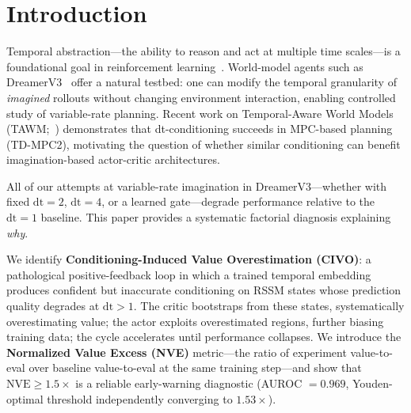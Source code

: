 \documentclass[10pt,letterpaper]{article}
\begin{document}
\section{Introduction}

Temporal abstraction---the ability to reason and act at multiple time scales---is a foundational goal in reinforcement learning~\citep{sutton1999options,precup2000temporal}.
World-model agents such as DreamerV3~\citep{hafner2023dreamerv3} offer a natural testbed: one can modify the temporal granularity of \emph{imagined} rollouts without changing environment interaction, enabling controlled study of variable-rate planning.
Recent work on Temporal-Aware World Models (TAWM;~\citealt{nhu2025tawm}) demonstrates that dt-conditioning succeeds in MPC-based planning (TD-MPC2), motivating the question of whether similar conditioning can benefit imagination-based actor-critic architectures.

All of our attempts at variable-rate imagination in DreamerV3---whether with fixed $\mathrm{dt}=2$, $\mathrm{dt}=4$, or a learned gate---degrade performance relative to the $\mathrm{dt}=1$ baseline.
This paper provides a systematic factorial diagnosis explaining \emph{why}.

We identify \textbf{Conditioning-Induced Value Overestimation (CIVO)}: a pathological positive-feedback loop in which a trained temporal embedding produces confident but inaccurate conditioning on RSSM states whose prediction quality degrades at $\mathrm{dt}>1$.
The critic bootstraps from these states, systematically overestimating value; the actor exploits overestimated regions, further biasing training data; the cycle accelerates until performance collapses.
We introduce the \textbf{Normalized Value Excess (NVE)} metric---the ratio of experiment value-to-eval over baseline value-to-eval at the same training step---and show that $\text{NVE} \geq 1.5\times$ is a reliable early-warning diagnostic (AUROC $= 0.969$, Youden-optimal threshold independently converging to $1.53\times$).
\end{document}
